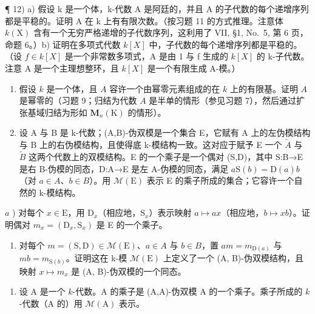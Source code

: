 ¶ 12) a) 假设 k 是一个体，k-代数 A 是阿廷的，并且 A 的子代数的每个递增序列都是平稳的。证明 A 在 k 上有有限次数。（按习题 11 的方式推理。注意体 \(k(\mathrm{X})\) 含有一个无穷严格递增的子代数序列，这利用了 VII, §1, No.~5, 第 6 页，命题 6。）b) 证明在多项式代数 \(k[X]\) 中，子代数的每个递增序列都是平稳的。（设 \(f \in k[X]\) 是一个非常数多项式，A 是由 1 与 f 生成的 \(k[X]\) 的 k-子代数。注意 A 是一个主理想整环，且 \(k[X]\) 是一个有限生成 A-模。）

\begin{enumerate}
\def\labelenumi{\arabic{enumi})}
\setcounter{enumi}{12}
\item
  假设 \(k\) 是一个体，且 \(A\) 容许一个由幂零元素组成的在 \(k\) 上的有限基。证明 \(A\) 是幂零的（习题 9；归结为代数 \(A\) 是半单的情形（参见习题 7），然后通过扩张基域归结为形如 \(\mathbf{M}_n(\mathrm{K})\) 的情形）。
\item
  设 A 与 B 是 k-代数；(A,B)-伪双模是一个集合 E，它赋有 A 上的左伪模结构与 B 上的右伪模结构，且使得底 k-模结构一致。这对应于赋予 E 一个 \(\widetilde{A}\) 与 \(\widetilde{B}\) 这两个代数上的双模结构。E 的一个乘子是一个偶对 (S,D)，其中 S:B→E 是右 B-伪模的同态，D:A→E 是左 A-伪模的同态，满足 \(a\mathrm{S}(b)=\mathrm{D}(a)b\)（对 \(a\in A\)、\(b\in B\)）。用 \(\mathcal{M}(\mathrm{E})\) 表示 E 的乘子所成的集合；它容许一个自然的 k-模结构。
\end{enumerate}

\(a\) ) 对每个 \(x\in \mathrm{E}\)，用 \(\mathrm{D}_x\)（相应地，\(\mathrm{S}_x\)）表示映射 \(a\mapsto ax\)（相应地，\(b\mapsto xb\)）。证明偶对 \(m_{x} = (\mathrm{D}_{x},\mathrm{S}_{x})\) 是 E 的一个乘子。

\begin{enumerate}
\def\labelenumi{\alph{enumi})}
\setcounter{enumi}{1}
\tightlist
\item
  对每个 \(m = (\mathrm{S}, \mathrm{D}) \in \mathcal{M}(\mathrm{E})\)、\(a \in A\) 与 \(b \in B\)，置 \(am = m_{\mathrm{D}(a)}\) 与 \(mb = m_{\mathrm{S}(b)}\)。证明这在 k-模 \(\mathcal{M}(\mathrm{E})\) 上定义了一个 (A, B)-伪双模结构，且映射 \(x \mapsto m_x\) 是 (A, B)-伪双模的一个同态。
\end{enumerate}

\begin{enumerate}
\def\labelenumi{\arabic{enumi})}
\setcounter{enumi}{14}
\tightlist
\item
  设 \(\mathrm{A}\) 是一个 \(k\)-代数。\(\mathrm{A}\) 的乘子是 (A,A)-伪双模 \(\mathrm{A}\) 的一个乘子。乘子所成的 \(k\)-代数（\(\mathrm{A}\) 的）用 \(\mathcal{M}(\mathrm{A})\) 表示。
\end{enumerate}

